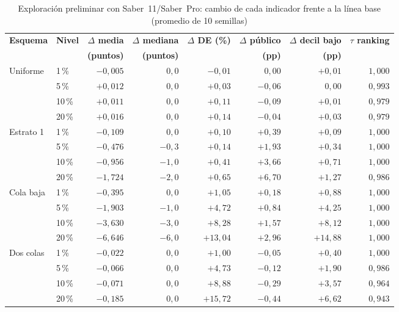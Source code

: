\documentclass[11pt,openany,oneside,letterpaper]{book}
\begin{document}
\begin{table}[!htbp]
\centering
\caption{Exploración preliminar con Saber~11/Saber~Pro: cambio de cada indicador frente a la línea base (promedio de 10 semillas)}
\label{tab:prelim_saber}
\small
\setlength{\tabcolsep}{4.5pt}
\begin{tabular}{llrrrrrr}
\toprule
\textbf{Esquema} & \textbf{Nivel} & \textbf{$\Delta$ media} & \textbf{$\Delta$ mediana} & \textbf{$\Delta$ DE (\%)} & \textbf{$\Delta$ público} & \textbf{$\Delta$ decil bajo} & \textbf{$\tau$ ranking} \\
 & & \textbf{(puntos)} & \textbf{(puntos)} & & \textbf{(pp)} & \textbf{(pp)} & \\
\midrule
 \multirow{4}{*}{Uniforme} & 1\,\% & $-0{,}005$ & $0{,}0$ & $-0{,}01$ & $0{,}00$ & $+0{,}01$ & $1{,}000$ \\
  & 5\,\% & $+0{,}012$ & $0{,}0$ & $+0{,}03$ & $-0{,}06$ & $0{,}00$ & $0{,}993$ \\
  & 10\,\% & $+0{,}011$ & $0{,}0$ & $+0{,}11$ & $-0{,}09$ & $+0{,}01$ & $0{,}979$ \\
  & 20\,\% & $+0{,}016$ & $0{,}0$ & $+0{,}14$ & $-0{,}04$ & $+0{,}03$ & $0{,}979$ \\
 \midrule
 \multirow{4}{*}{Estrato 1} & 1\,\% & $-0{,}109$ & $0{,}0$ & $+0{,}10$ & $+0{,}39$ & $+0{,}09$ & $1{,}000$ \\
  & 5\,\% & $-0{,}476$ & $-0{,}3$ & $+0{,}14$ & $+1{,}93$ & $+0{,}34$ & $1{,}000$ \\
  & 10\,\% & $-0{,}956$ & $-1{,}0$ & $+0{,}41$ & $+3{,}66$ & $+0{,}71$ & $1{,}000$ \\
  & 20\,\% & $-1{,}724$ & $-2{,}0$ & $+0{,}65$ & $+6{,}70$ & $+1{,}27$ & $0{,}986$ \\
 \midrule
 \multirow{4}{*}{Cola baja} & 1\,\% & $-0{,}395$ & $0{,}0$ & $+1{,}05$ & $+0{,}18$ & $+0{,}88$ & $1{,}000$ \\
  & 5\,\% & $-1{,}903$ & $-1{,}0$ & $+4{,}72$ & $+0{,}84$ & $+4{,}25$ & $1{,}000$ \\
  & 10\,\% & $-3{,}630$ & $-3{,}0$ & $+8{,}28$ & $+1{,}57$ & $+8{,}12$ & $1{,}000$ \\
  & 20\,\% & $-6{,}646$ & $-6{,}0$ & $+13{,}04$ & $+2{,}96$ & $+14{,}88$ & $1{,}000$ \\
 \midrule
 \multirow{4}{*}{Dos colas} & 1\,\% & $-0{,}022$ & $0{,}0$ & $+1{,}00$ & $-0{,}05$ & $+0{,}40$ & $1{,}000$ \\
  & 5\,\% & $-0{,}066$ & $0{,}0$ & $+4{,}73$ & $-0{,}12$ & $+1{,}90$ & $0{,}986$ \\
  & 10\,\% & $-0{,}071$ & $0{,}0$ & $+8{,}88$ & $-0{,}29$ & $+3{,}57$ & $0{,}964$ \\
  & 20\,\% & $-0{,}185$ & $0{,}0$ & $+15{,}72$ & $-0{,}44$ & $+6{,}62$ & $0{,}943$ \\
 \bottomrule
\end{tabular}
\end{table}
\end{document}
